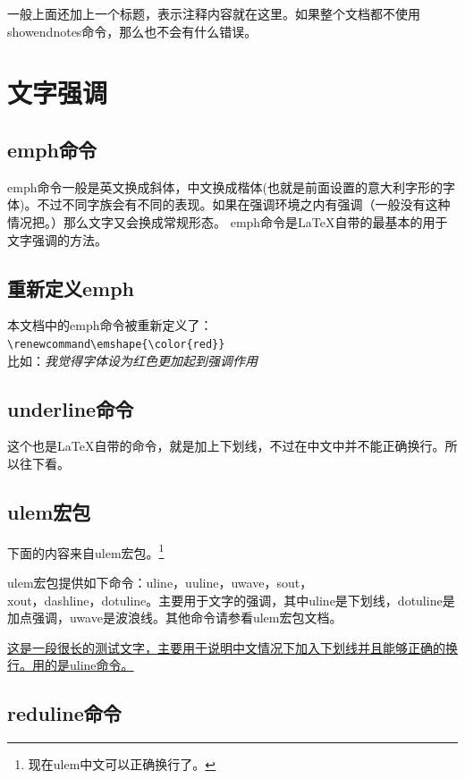 \documentclass[12pt,oneside]{book}
\begin{document}
\begin{common-format}
一般上面还加上一个标题，表示注释内容就在这里。如果整个文档都不使用showendnotes命令，那么也不会有什么错误。


\section{文字强调}
\subsection{emph命令}
emph命令一般是英文换成斜体，中文换成楷体(也就是前面设置的意大利字形的字体)。不过不同字族会有不同的表现。如果在强调环境之内有强调（一般没有这种情况把。）那么文字又会换成常规形态。
emph命令是\LaTeX 自带的最基本的用于文字强调的方法。


\subsection{重新定义emph}
本文档中的emph命令被重新定义了：\\
\verb+\renewcommand\emshape{\color{red}}+\\
比如：\emph{我觉得字体设为红色更加起到强调作用}

\subsection{underline命令}
这个也是\LaTeX 自带的命令，就是加上下划线，不过在中文中并不能正确换行。所以往下看。

\subsection{ulem宏包}
下面的内容来自ulem宏包。\footnote{现在ulem中文可以正确换行了。}

ulem宏包提供如下命令：uline，uuline，uwave，sout，\\ xout，dashline，dotuline。主要用于文字的强调，其中uline是下划线，dotuline是加点强调，uwave是波浪线。其他命令请参看ulem宏包文档。

\uline{这是一段很长的测试文字，主要用于说明中文情况下加入下划线并且能够正确的换行。用的是uline命令。}


\subsection{reduline命令}


\end{common-format}
\end{document}
